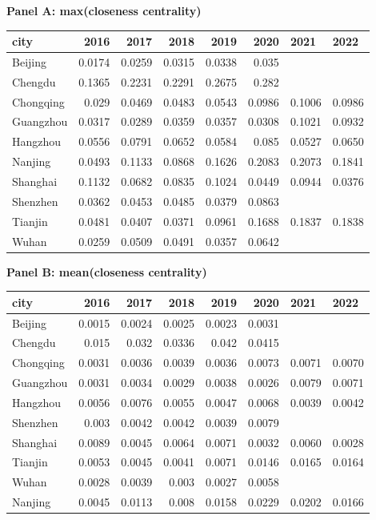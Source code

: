 \textbf{Panel A: max(closeness centrality)}\\
\begin{tabular}{lrrrrrll}
\hline
 city      &   2016 &   2017 &   2018 &   2019 &   2020 & 2021   & 2022   \\
\hline
 Beijing   & 0.0174 & 0.0259 & 0.0315 & 0.0338 & 0.035  &        &        \\
 Chengdu   & 0.1365 & 0.2231 & 0.2291 & 0.2675 & 0.282  &        &        \\
 Chongqing & 0.029  & 0.0469 & 0.0483 & 0.0543 & 0.0986 & 0.1006 & 0.0986 \\
 Guangzhou & 0.0317 & 0.0289 & 0.0359 & 0.0357 & 0.0308 & 0.1021 & 0.0932 \\
 Hangzhou  & 0.0556 & 0.0791 & 0.0652 & 0.0584 & 0.085  & 0.0527 & 0.0650 \\
 Nanjing   & 0.0493 & 0.1133 & 0.0868 & 0.1626 & 0.2083 & 0.2073 & 0.1841 \\
 Shanghai  & 0.1132 & 0.0682 & 0.0835 & 0.1024 & 0.0449 & 0.0944 & 0.0376 \\
 Shenzhen  & 0.0362 & 0.0453 & 0.0485 & 0.0379 & 0.0863 &        &        \\
 Tianjin   & 0.0481 & 0.0407 & 0.0371 & 0.0961 & 0.1688 & 0.1837 & 0.1838 \\
 Wuhan     & 0.0259 & 0.0509 & 0.0491 & 0.0357 & 0.0642 &        &        \\
\hline
\end{tabular}

\textbf{Panel B: mean(closeness centrality)}\\
\begin{tabular}{lrrrrrll}
\hline
 city      &   2016 &   2017 &   2018 &   2019 &   2020 & 2021   & 2022   \\
\hline
 Beijing   & 0.0015 & 0.0024 & 0.0025 & 0.0023 & 0.0031 &        &        \\
 Chengdu   & 0.015  & 0.032  & 0.0336 & 0.042  & 0.0415 &        &        \\
 Chongqing & 0.0031 & 0.0036 & 0.0039 & 0.0036 & 0.0073 & 0.0071 & 0.0070 \\
 Guangzhou & 0.0031 & 0.0034 & 0.0029 & 0.0038 & 0.0026 & 0.0079 & 0.0071 \\
 Hangzhou  & 0.0056 & 0.0076 & 0.0055 & 0.0047 & 0.0068 & 0.0039 & 0.0042 \\
 Shenzhen  & 0.003  & 0.0042 & 0.0042 & 0.0039 & 0.0079 &        &        \\
 Shanghai  & 0.0089 & 0.0045 & 0.0064 & 0.0071 & 0.0032 & 0.0060 & 0.0028 \\
 Tianjin   & 0.0053 & 0.0045 & 0.0041 & 0.0071 & 0.0146 & 0.0165 & 0.0164 \\
 Wuhan     & 0.0028 & 0.0039 & 0.003  & 0.0027 & 0.0058 &        &        \\
 Nanjing   & 0.0045 & 0.0113 & 0.008  & 0.0158 & 0.0229 & 0.0202 & 0.0166 \\
\hline
\end{tabular}

